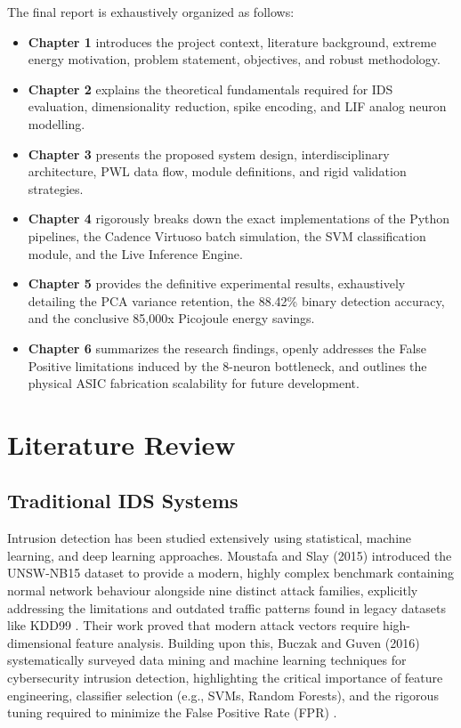 \documentclass{ieeeaccess}
\begin{document}
The final report is exhaustively organized as follows:
\begin{itemize}
\item \textbf{Chapter 1} introduces the project context, literature background, extreme energy motivation, problem statement, objectives, and robust methodology.
\item \textbf{Chapter 2} explains the theoretical fundamentals required for IDS evaluation, dimensionality reduction, spike encoding, and LIF analog neuron modelling.
\item \textbf{Chapter 3} presents the proposed system design, interdisciplinary architecture, PWL data flow, module definitions, and rigid validation strategies.
\item \textbf{Chapter 4} rigorously breaks down the exact implementations of the Python pipelines, the Cadence Virtuoso batch simulation, the SVM classification module, and the Live Inference Engine.
\item \textbf{Chapter 5} provides the definitive experimental results, exhaustively detailing the PCA variance retention, the 88.42\% binary detection accuracy, and the conclusive 85,000x Picojoule energy savings.
\item \textbf{Chapter 6} summarizes the research findings, openly addresses the False Positive limitations induced by the 8-neuron bottleneck, and outlines the physical ASIC fabrication scalability for future development.
\end{itemize}

\section{Literature Review}

\subsection{Traditional IDS Systems}
Intrusion detection has been studied extensively using statistical, machine learning, and deep learning approaches. Moustafa and Slay (2015) introduced the UNSW-NB15 dataset to provide a modern, highly complex benchmark containing normal network behaviour alongside nine distinct attack families, explicitly addressing the limitations and outdated traffic patterns found in legacy datasets like KDD99 \cite{Moustafa2015}. Their work proved that modern attack vectors require high-dimensional feature analysis. Building upon this, Buczak and Guven (2016) systematically surveyed data mining and machine learning techniques for cybersecurity intrusion detection, highlighting the critical importance of feature engineering, classifier selection (e.g., SVMs, Random Forests), and the rigorous tuning required to minimize the False Positive Rate (FPR) \cite{Buczak2016}. 
\end{document}

